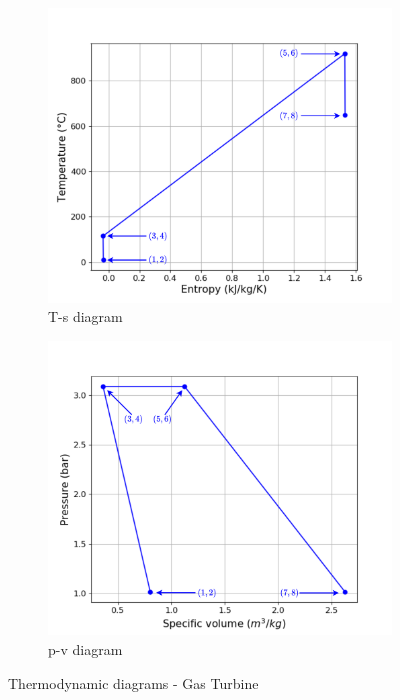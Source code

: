 \begin{figure}[H]
     \centering
     \begin{subfigure}[b]{0.4\textwidth}
         \centering
         \includegraphics[width=\textwidth]{Ts_GT}
         \caption{T-s diagram}
         \label{fig:C5_Ts_GT}
     \end{subfigure}
     \begin{subfigure}[b]{0.4\textwidth}
         \centering
         \includegraphics[width=\textwidth]{pv_GT}
         \caption{p-v diagram}
         \label{fig:C5_pv_GT}
     \end{subfigure}
        \caption{Thermodynamic diagrams - Gas Turbine}
        \label{fig:C5_thermo_diagram_GT}
\end{figure}

